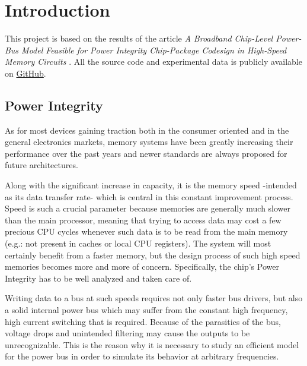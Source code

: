 \section{Introduction}
This project is based on the results of the article \emph{A Broadband Chip-Level Power-Bus Model Feasible for Power Integrity Chip-Package Codesign in High-Speed Memory Circuits} \cite{Hao-HsiangChuang2010ABCP}. All the source code and experimental data is publicly available on \href{https://github.com/arscisca/mem-pmod}{GitHub}.

\subsection{Power Integrity}
As for most devices gaining traction both in the consumer oriented and in the general electronics markets, memory systems have been greatly increasing their performance over the past years and newer standards are always proposed for future architectures.

Along with the significant increase in capacity, it is the memory speed -intended as its data transfer rate- which is central in this constant improvement process. Speed is such a crucial parameter because memories are generally much slower than the main processor, meaning that trying to access data may cost a few precious CPU cycles whenever such data is to be read from the main memory (e.g.: not present in caches or local CPU registers). The system will most certainly benefit from a faster memory, but the design process of such high speed memories becomes more and more of concern. Specifically, the chip's Power Integrity has to be well analyzed and taken care of.

Writing data to a bus at such speeds requires not only faster bus drivers, but also a solid internal power bus which may suffer from the constant high frequency, high current switching that is required. Because of the parasitics of the bus, voltage drops and unintended filtering may cause the outputs to be unrecognizable.
This is the reason why it is necessary to study an efficient model for the power bus in order to simulate its behavior at arbitrary frequencies.
